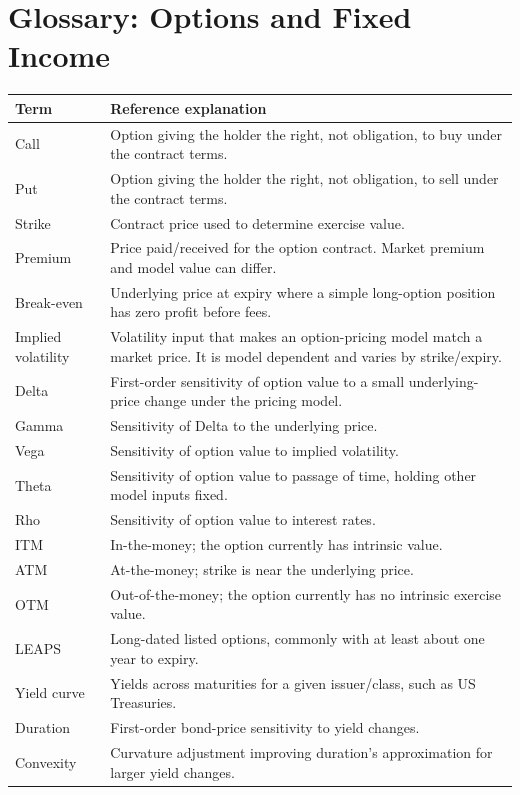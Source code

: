 \documentclass[11pt]{article}
\begin{document}
\section{Glossary: Options and Fixed Income}
\begin{longtable}{p{}p{}}
\toprule
Term & Reference explanation\\
\midrule
Call & Option giving the holder the right, not obligation, to buy under the contract terms.\\
Put & Option giving the holder the right, not obligation, to sell under the contract terms.\\
Strike & Contract price used to determine exercise value.\\
Premium & Price paid/received for the option contract. Market premium and model value can differ.\\
Break-even & Underlying price at expiry where a simple long-option position has zero profit before fees.\\
Implied volatility & Volatility input that makes an option-pricing model match a market price. It is model dependent and varies by strike/expiry.\\
Delta & First-order sensitivity of option value to a small underlying-price change under the pricing model.\\
Gamma & Sensitivity of Delta to the underlying price.\\
Vega & Sensitivity of option value to implied volatility.\\
Theta & Sensitivity of option value to passage of time, holding other model inputs fixed.\\
Rho & Sensitivity of option value to interest rates.\\
ITM & In-the-money; the option currently has intrinsic value.\\
ATM & At-the-money; strike is near the underlying price.\\
OTM & Out-of-the-money; the option currently has no intrinsic exercise value.\\
LEAPS & Long-dated listed options, commonly with at least about one year to expiry.\\
Yield curve & Yields across maturities for a given issuer/class, such as US Treasuries.\\
Duration & First-order bond-price sensitivity to yield changes.\\
Convexity & Curvature adjustment improving duration's approximation for larger yield changes.\\
\bottomrule
\end{longtable}
\end{document}

